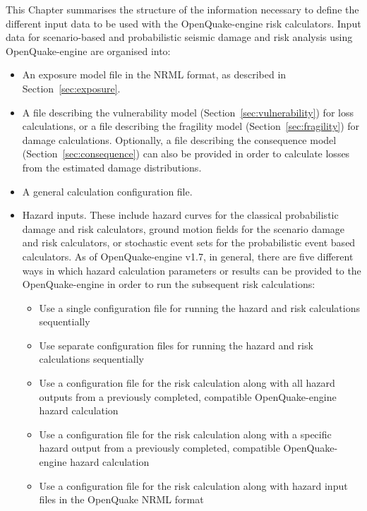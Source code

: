 This Chapter summarises the structure of the information necessary to define
the different input data to be used with the OpenQuake-engine risk
calculators. Input data for scenario-based and probabilistic seismic damage
and risk analysis using OpenQuake-engine are organised into:

\begin{itemize}

  \item An exposure model file in the NRML format, as described in 
    Section~\ref{sec:exposure}.

  \item A file describing the \gls{vulnerability model}
    (Section~\ref{sec:vulnerability}) for loss calculations, or a 
  	file describing the \gls{fragility model} (Section~\ref{sec:fragility})
    for damage calculations. Optionally, a file describing the
    \gls{consequence model} (Section~\ref{sec:consequence}) can also be
  	provided in order to calculate losses from the estimated damage
  	distributions.

  \item A general calculation configuration file.

  \item Hazard inputs. These include hazard curves for the classical
    probabilistic damage and risk calculators, ground motion fields for the
    scenario damage and risk calculators, or stochastic event sets for the
    probabilistic event based calculators. As of OpenQuake-engine v1.7, in
    general, there are five different ways in which hazard calculation
    parameters or results can be provided to the OpenQuake-engine in order to
    run the subsequent risk calculations:

    \begin{itemize}

      \item Use a single configuration file for running the hazard and risk
      calculations sequentially

      \item Use separate configuration files for running the hazard and risk
      calculations sequentially

      \item Use a configuration file for the risk calculation along with all
      hazard outputs from a previously completed, compatible
      OpenQuake-engine hazard calculation

      \item Use a configuration file for the risk calculation along with a
      specific hazard output from a previously completed, compatible
      OpenQuake-engine hazard calculation

      \item Use a configuration file for the risk calculation along with
      hazard input files in the OpenQuake NRML format

    \end{itemize}

\end{itemize}

